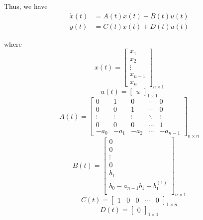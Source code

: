 Thus, we have
\[
    \begin{aligned}
        \dot{x}(t) & = A(t) x(t) + B(t) u(t) \\
        y(t)       & = C(t) x(t) + D(t) u(t)
    \end{aligned}
\]

where
\[
    x(t) =
    \begin{bmatrix}
        x_1     \\
        x_2     \\
        \vdots  \\
        x_{n-1} \\
        x_n
    \end{bmatrix}
    _{n \times 1}
\]
\[
    u(t) =
    \begin{bmatrix}
        u
    \end{bmatrix}
    _{1 \times 1}
\]
\[
    A(t) =
    \begin{bmatrix}
        0      & 1      & 0      & \cdots & 0        \\
        0      & 0      & 1      & \cdots & 0        \\
        \vdots & \vdots & \vdots & \ddots & \vdots   \\
        0      & 0      & 0      & \cdots & 1        \\
        -a_0   & -a_1   & -a_2   & \cdots & -a_{n-1}
    \end{bmatrix}
    _{n \times n}
\]
\[
    B(t) =
    \begin{bmatrix}
        0                            \\
        0                            \\
        \vdots                       \\
        0                            \\
        b_1                          \\
        b_0 - a_{n-1}b_1 - b_1^{(1)} \\
    \end{bmatrix}
    _{n \times 1}
\]
\[
    C(t) =
    \begin{bmatrix}
        1 & 0 & 0 & \cdots & 0
    \end{bmatrix}
    _{1 \times n}
\]
\[
    D(t) =
    \begin{bmatrix}
        0
    \end{bmatrix}
    _{1 \times 1}
\]

